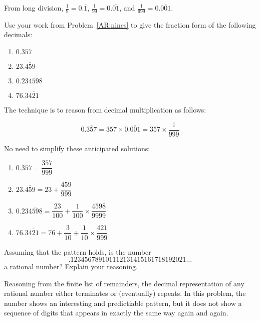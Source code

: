 \documentclass[nooutcomes]{ximera}
\begin{document}
\begin{teachingnote}
From long division, $\frac{1}{9} = 0.\overline{1}$, $\frac{1}{99} = 0.\overline{01}$, and $\frac{1}{999} = 0.\overline{001}$.  
\end{teachingnote}

\begin{problem}
Use your work from Problem~\ref{AR:nines} to give the fraction form of
the following decimals:
\begin{enumerate}
\item $0.\overline{357}$
\item $23.\overline{459}$
\item $0.23\overline{4598}$
\item $76.3\overline{421}$
\end{enumerate}
\end{problem}

\begin{teachingnote}
The technique is to reason from decimal multiplication as follows:  

$$0.\overline{357} = 357\times  0.\overline{001} = 357 \times \frac{1}{999}$$

No need to simplify these anticipated solutions: 
\begin{enumerate}
\item $0.\overline{357} = \dfrac{357}{999}$
\item $23.\overline{459} = 23 + \dfrac{459}{999}$
\item $0.23\overline{4598} = \dfrac{23}{100}+ \dfrac{1}{100}\times\dfrac{4598}{9999}$
\item $76.3\overline{421} = 76 + \dfrac{3}{10}+ \dfrac{1}{10}\times\dfrac{421}{999}$
\end{enumerate}
\end{teachingnote}

\begin{problem} 
Assuming that the pattern holds, is the number
\[
.123456789101112131415161718192021\dots
\]
a rational number? Explain your reasoning.
\end{problem}

\begin{teachingnote}
Reasoning from the finite list of remainders, the decimal representation of any rational number either terminates or (eventually) repeats.  In this problem, the number shows an interesting and predictiable pattern, but it does not show a sequence of digits that appears in exactly the same way again and again.  
\end{teachingnote}
\end{document}
